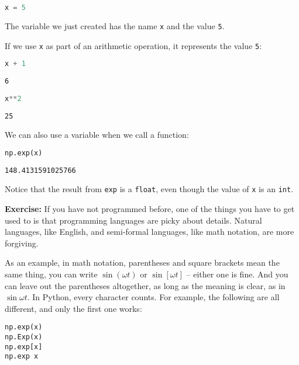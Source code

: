 \documentclass[
]{book}
\newcommand{\passthrough}[1]{#1}
\begin{document}
\begin{lstlisting}[language=Python]
x = 5
\end{lstlisting}

The variable we just created has the name \passthrough{\lstinline!x!}
and the value \passthrough{\lstinline!5!}.

If we use \passthrough{\lstinline!x!} as part of an arithmetic
operation, it represents the value \passthrough{\lstinline!5!}:

\begin{lstlisting}[language=Python]
x + 1
\end{lstlisting}

\begin{lstlisting}
6
\end{lstlisting}

\begin{lstlisting}[language=Python]
x**2
\end{lstlisting}

\begin{lstlisting}
25
\end{lstlisting}

We can also use a variable when we call a function:

\begin{lstlisting}[language=Python]
np.exp(x)
\end{lstlisting}

\begin{lstlisting}
148.4131591025766
\end{lstlisting}

Notice that the result from \passthrough{\lstinline!exp!} is a
\passthrough{\lstinline!float!}, even though the value of
\passthrough{\lstinline!x!} is an \passthrough{\lstinline!int!}.

\textbf{Exercise:} If you have not programmed before, one of the things
you have to get used to is that programming languages are picky about
details. Natural languages, like English, and semi-formal languages,
like math notation, are more forgiving.

As an example, in math notation, parentheses and square brackets mean
the same thing, you can write \(\sin (\omega t)\) or \(\sin [\omega t]\)
-- either one is fine. And you can leave out the parentheses altogether,
as long as the meaning is clear, as in \(\sin \omega t\). In Python,
every character counts. For example, the following are all different,
and only the first one works:

\begin{lstlisting}
np.exp(x)
np.Exp(x)
np.exp[x]
np.exp x
\end{lstlisting}
\end{document}
